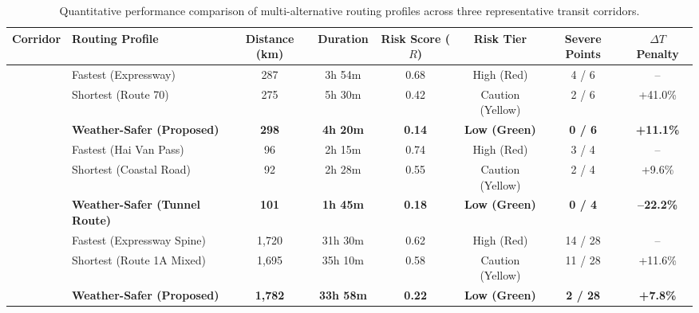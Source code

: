 \begin{table}[H]
\centering
\caption[Quantitative performance comparison of multi-alternative routing profiles]{Quantitative performance comparison of multi-alternative routing profiles across three representative transit corridors.}
\label{tab:corridor_eval_en}
\begin{adjustbox}{width=\textwidth,center}
\begin{tabular}{llcccccc}
\toprule
\textbf{Corridor} & \textbf{Routing Profile} & \textbf{Distance (km)} & \textbf{Duration} & \textbf{Risk Score ($R$)} & \textbf{Risk Tier} & \textbf{Severe Points} & \textbf{$\Delta T$ Penalty} \\
\midrule
{} 
  & Fastest (Expressway) & 287 & 3h 54m & 0.68 & High (Red) & 4 / 6 & -- \\
  & Shortest (Route 70) & 275 & 5h 30m & 0.42 & Caution (Yellow) & 2 / 6 & +41.0\% \\
  & \textbf{Weather-Safer (Proposed)} & \textbf{298} & \textbf{4h 20m} & \textbf{0.14} & \textbf{Low (Green)} & \textbf{0 / 6} & \textbf{+11.1\%} \\
\midrule
{} 
  & Fastest (Hai Van Pass) & 96 & 2h 15m & 0.74 & High (Red) & 3 / 4 & -- \\
  & Shortest (Coastal Road) & 92 & 2h 28m & 0.55 & Caution (Yellow) & 2 / 4 & +9.6\% \\
  & \textbf{Weather-Safer (Tunnel Route)} & \textbf{101} & \textbf{1h 45m} & \textbf{0.18} & \textbf{Low (Green)} & \textbf{0 / 4} & \textbf{--22.2\%} \\
\midrule
{} 
  & Fastest (Expressway Spine) & 1,720 & 31h 30m & 0.62 & High (Red) & 14 / 28 & -- \\
  & Shortest (Route 1A Mixed) & 1,695 & 35h 10m & 0.58 & Caution (Yellow) & 11 / 28 & +11.6\% \\
  & \textbf{Weather-Safer (Proposed)} & \textbf{1,782} & \textbf{33h 58m} & \textbf{0.22} & \textbf{Low (Green)} & \textbf{2 / 28} & \textbf{+7.8\%} \\
\bottomrule
\end{tabular}
\end{adjustbox}
\end{table}

